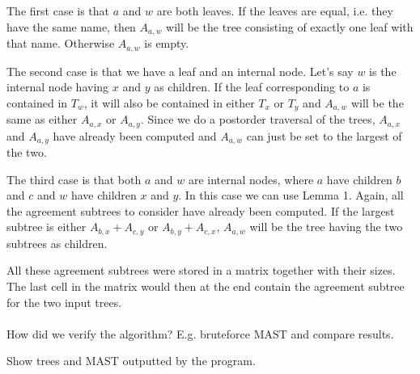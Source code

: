 The first case is that $a$ and $w$ are both leaves. If the leaves are equal, i.e. they have the same name, then $A_{a,w}$ will be the tree consisting of exactly one leaf with that name. Otherwise $A_{a,w}$ is empty.

The second case is that we have a leaf and an internal node. Let's say $w$ is the internal node having $x$ and $y$ as children. If the leaf corresponding to $a$ is contained in $T_w$, it will also be contained in either $T_x$ or $T_y$ and $A_{a,w}$ will be the same as either $A_{a,x}$ or $A_{a,y}$. Since we do a postorder traversal of the trees, $A_{a,x}$ and $A_{a,y}$ have already been computed and $A_{a,w}$ can just be set to the largest of the two.

The third case is that both $a$ and $w$ are internal nodes, where $a$ have children $b$ and $c$ and $w$ have children $x$ and $y$. In this case we can use Lemma 1. Again, all the agreement subtrees to consider have already been computed. If the largest subtree is either $A_{b,x} + A_{c,y}$ or $A_{b,y} + A_{c,x}$, $A_{a,w}$ will be the tree having the two subtrees as children.

All these agreement subtrees were stored in a matrix together with their sizes. The last cell in the matrix would then at the end contain the agreement subtree for the two input trees.
\\
\\
How did we verify the algorithm? E.g. bruteforce MAST and compare results.

Show trees and MAST outputted by the program.

\todo{\dots}